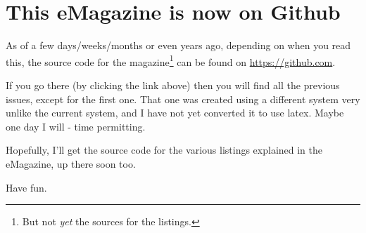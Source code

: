 \chapter{This eMagazine is now on Github}
As of a few days/weeks/months or even years ago, depending on when you read this, the source code for the magazine\footnote{But not \emph{yet} the sources for the listings.} can be found on \href{https://github.com/NormanDunbar/QLAssemblyLanguageMagazine}{https://github.com}.

If you go there (by clicking the link above) then you will find all the previous issues, except for the first one. That one was created using a different system very unlike the current system, and I have not yet converted it to use latex. Maybe one day I will - time permitting.

Hopefully, I'll get the source code for the various listings explained in the eMagazine, up there soon too.


Have fun.